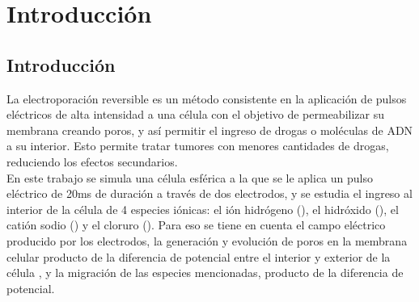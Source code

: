 \documentclass[11pt,a4paper,twoside]{tesis}
\newcommand{\h}{\ce{H^+}}
\newcommand{\oh}{\ce{OH^-}}
\newcommand{\na}{\ce{Na^+}}
\newcommand{\cl}{\ce{Cl^-}}
\begin{document}
\def\titulo{Licenciado }

\def\autor{Mauricio Alfonso}
\def\tituloTesis{Estudio de los Mecanismos Básicos de Electroporación a Través de la Modelación Numérica}
\def\runtitulo{Estudio de los Mecanismos Básicos de Electroporación a Través de la Modelación Numérica}
\def\runtitle{Study of the Basic Mechanisms of Electroporation Through Numeric Modelling}
\def\director{Alejandro Soba}
\def\codirector{Guillermo Marshall}
\def\lugar{Buenos Aires, 2014}


\frontmatter
\pagestyle{empty}


\cleardoublepage


%

\cleardoublepage
\tableofcontents

\mainmatter
\pagestyle{headings}


\chapter{Introducción}
\section{Introducción}
La electroporación reversible es un método consistente en la aplicación de pulsos eléctricos de alta intensidad a una célula con el objetivo de permeabilizar su membrana creando poros, y así permitir el ingreso de drogas o moléculas de ADN a su interior. Esto permite tratar tumores con menores cantidades de drogas, reduciendo los efectos secundarios.\\

En este trabajo se simula una célula esférica a la que se le aplica un pulso eléctrico de 20\si{\milli\second} de duración a través de dos electrodos, y se estudia el ingreso al interior de la célula de 4 especies iónicas: el ión hidrógeno (\h), el hidróxido (\oh), el catión sodio (\na) y el cloruro (\cl). Para eso se tiene en cuenta el campo eléctrico producido por los electrodos, la generación y evolución de poros en la membrana celular producto de la diferencia de potencial entre el interior y exterior de la célula , y la migración de las especies mencionadas, producto de la diferencia de potencial.\\
\end{document}
